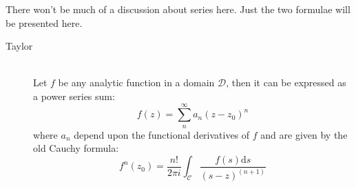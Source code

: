 \documentclass[11pt]{article}
\begin{document}
\begin{sloppypar}
There won\rq{}t be much of a discussion about series here. Just the two formulae will be presented here.
\begin{description}
\item[Taylor] \hfill \\
	Let $f$ be any analytic function in a domain $\mathcal{D}$, then it can be expressed as a power series sum:
$$f(z) = \sum_n^{\infty} a_{n}(z-z_{0})^n$$ where $a_{n}$ depend upon the functional derivatives of $f$ and are given by the old Cauchy formula:
$$f^n(z_{0}) = \frac{n!}{2\pi i} \int_\mathcal{C} \frac{f(s) \mathrm{d}s}{(s-z)^(n+1)}$$
\end{description}

\end{sloppypar}
\end{document}
